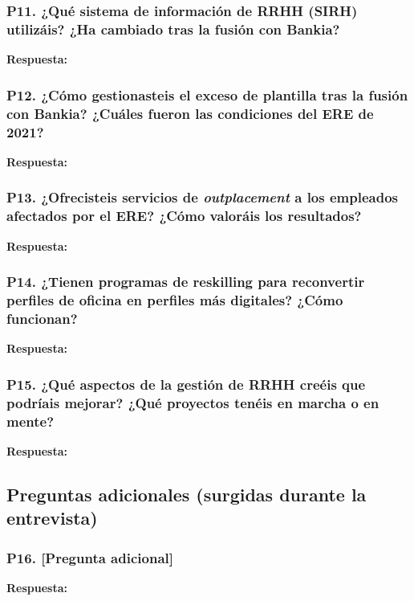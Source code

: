 \subsubsection*{P11. ¿Qué sistema de información de RRHH (SIRH) utilizáis?
¿Ha cambiado tras la fusión con Bankia?}

\textbf{Respuesta:}\newline
[...]

\subsubsection*{P12. ¿Cómo gestionasteis el exceso de plantilla tras la fusión
con Bankia? ¿Cuáles fueron las condiciones del ERE de 2021?}

\textbf{Respuesta:}\newline
[...]

\subsubsection*{P13. ¿Ofrecisteis servicios de \textit{outplacement} a los
empleados afectados por el ERE? ¿Cómo valoráis los resultados?}

\textbf{Respuesta:}\newline
[...]

\subsubsection*{P14. ¿Tienen programas de reskilling para reconvertir perfiles
de oficina en perfiles más digitales? ¿Cómo funcionan?}

\textbf{Respuesta:}\newline
[...]

\subsubsection*{P15. ¿Qué aspectos de la gestión de RRHH creéis que podríais
mejorar? ¿Qué proyectos tenéis en marcha o en mente?}

\textbf{Respuesta:}\newline
[...]

\subsection{Preguntas adicionales (surgidas durante la entrevista)}


\subsubsection*{P16. [Pregunta adicional]}

\textbf{Respuesta:}\newline
[...]
